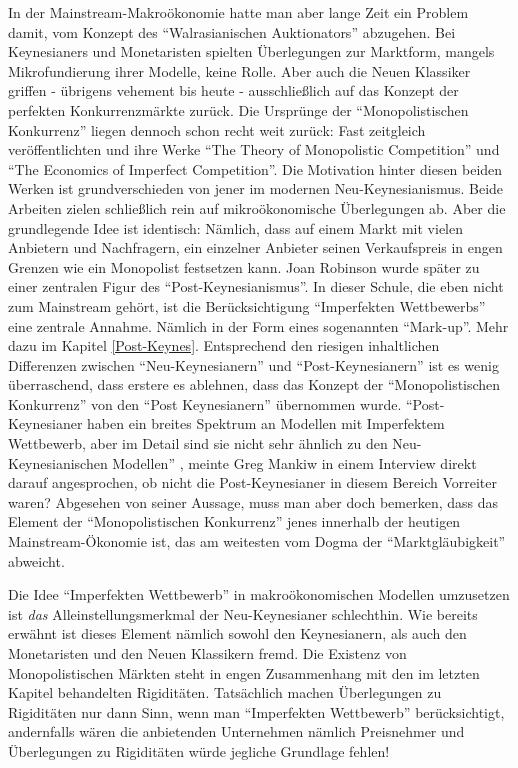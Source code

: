 In der Mainstream-Makroökonomie hatte man aber lange Zeit ein Problem damit, vom Konzept des "`Walrasianischen Auktionators"' abzugehen. Bei Keynesianers und Monetaristen spielten Überlegungen zur Marktform, mangels Mikrofundierung ihrer Modelle, keine Rolle. Aber auch die Neuen Klassiker griffen - übrigens vehement bis heute -  ausschließlich auf das Konzept der perfekten Konkurrenzmärkte zurück. Die Ursprünge der "`Monopolistischen Konkurrenz"' liegen dennoch schon recht weit zurück: Fast zeitgleich veröffentlichten \textcite{Chamberlin1933} und \textcite{Robinson1933} ihre Werke "`The Theory of Monopolistic Competition"' und "`The Economics of Imperfect Competition"'. Die Motivation hinter diesen beiden Werken ist grundverschieden von jener im modernen Neu-Keynesianismus. Beide Arbeiten zielen schließlich rein auf mikroökonomische Überlegungen ab. Aber die grundlegende Idee ist identisch: Nämlich, dass auf einem Markt mit vielen Anbietern und Nachfragern, ein einzelner Anbieter seinen Verkaufspreis in engen Grenzen wie ein Monopolist festsetzen kann. Joan Robinson wurde später zu einer zentralen Figur des "`Post-Keynesianismus"'. In dieser Schule, die eben nicht zum Mainstream gehört,  ist die Berücksichtigung "`Imperfekten Wettbewerbs"' eine zentrale Annahme. Nämlich in der Form eines sogenannten "`Mark-up"'. Mehr dazu im Kapitel \ref{Post-Keynes}. Entsprechend den riesigen inhaltlichen Differenzen zwischen "`Neu-Keynesianern"' und "`Post-Keynesianern"' ist es wenig überraschend, dass erstere es ablehnen, dass das Konzept der "`Monopolistischen Konkurrenz"' von den "`Post Keynesianern"' übernommen wurde. "`Post-Keynesianer haben ein breites Spektrum an Modellen mit Imperfektem Wettbewerb, aber im Detail sind sie nicht sehr ähnlich zu den Neu-Keynesianischen Modellen"' \textcite[S. 439]{Snowdon2005}, meinte Greg Mankiw in einem Interview direkt darauf angesprochen, ob nicht die Post-Keynesianer in diesem Bereich Vorreiter waren? Abgesehen von seiner Aussage, muss man aber doch bemerken, dass das Element der "`Monopolistischen Konkurrenz"' jenes innerhalb der heutigen Mainstream-Ökonomie ist, das am weitesten vom Dogma der "`Marktgläubigkeit"' abweicht. 

Die Idee "`Imperfekten Wettbewerb"' in makroökonomischen Modellen umzusetzen ist \textit{das} Alleinstellungsmerkmal der Neu-Keynesianer schlechthin. Wie bereits erwähnt ist dieses Element nämlich sowohl den Keynesianern, als auch den Monetaristen und den Neuen Klassikern fremd. 
Die Existenz von Monopolistischen Märkten steht in engen Zusammenhang mit den im letzten Kapitel behandelten Rigiditäten. Tatsächlich machen Überlegungen zu Rigiditäten nur dann Sinn, wenn man "`Imperfekten Wettbewerb"' berücksichtigt, andernfalls wären die anbietenden Unternehmen nämlich Preisnehmer und Überlegungen zu Rigiditäten würde jegliche Grundlage fehlen!

